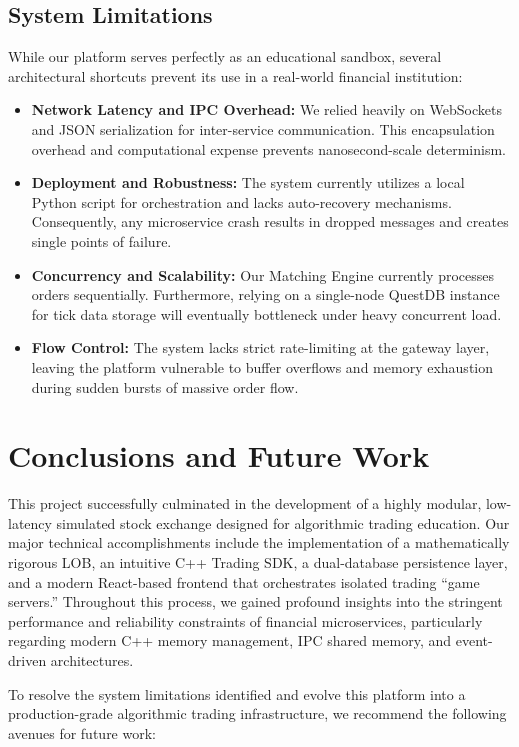 \documentclass[12pt,a4paper]{article}
\begin{document}
\subsection{System Limitations}
While our platform serves perfectly as an educational sandbox, several architectural shortcuts prevent its use in a real-world financial institution:

\begin{itemize}
    \item \textbf{Network Latency and IPC Overhead:} We relied heavily on WebSockets and JSON serialization for inter-service communication. This encapsulation overhead and computational expense prevents nanosecond-scale determinism.
    \item \textbf{Deployment and Robustness:} The system currently utilizes a local Python script for orchestration and lacks auto-recovery mechanisms. Consequently, any microservice crash results in dropped messages and creates single points of failure.
    \item \textbf{Concurrency and Scalability:} Our Matching Engine currently processes orders sequentially. Furthermore, relying on a single-node QuestDB instance for tick data storage will eventually bottleneck under heavy concurrent load.
    \item \textbf{Flow Control:} The system lacks strict rate-limiting at the gateway layer, leaving the platform vulnerable to buffer overflows and memory exhaustion during sudden bursts of massive order flow.
\end{itemize}


\section{Conclusions and Future Work}

This project successfully culminated in the development of a highly modular, low-latency simulated stock exchange designed for algorithmic trading education. Our major technical accomplishments include the implementation of a mathematically rigorous LOB, an intuitive C++ Trading SDK, a dual-database persistence layer, and a modern React-based frontend that orchestrates isolated trading ``game servers.'' Throughout this process, we gained profound insights into the stringent performance and reliability constraints of financial microservices, particularly regarding modern C++ memory management, IPC shared memory, and event-driven architectures.

To resolve the system limitations identified and evolve this platform into a production-grade algorithmic trading infrastructure, we recommend the following avenues for future work:
\end{document}
